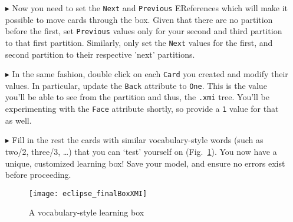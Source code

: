 \begin{itemize}
\item[$\blacktriangleright$] Now you need to set the \texttt{Next} and \texttt{Previous} EReferences which will make it possible to move cards through the
box. Given that there are no partition before the first, set \texttt{Previous} values only for your second and third partition to that first partition.
Similarly, only set the \texttt{Next} values for the first, and second partition to their respective 'next' partitions.

\item[$\blacktriangleright$] In the same fashion, double click on each \texttt{Card} you created and modify their values. In particular, update the
\texttt{Back} attribute to \texttt{One}. This is the value you'll be able to see from the partition and thus, the \texttt{.xmi} tree. You'll be experimenting
with the \texttt{Face} attribute shortly, so provide a \texttt{1} value for that as well.

\item[$\blacktriangleright$] Fill in the rest the cards with similar vocabulary-style words (such as two/2, three/3, \ldots) that you can `test' yourself on
(Fig.~\ref{eclipse:finalXMI}). You now have a unique, customized learning box! Save your model, and ensure no errors exist before proceeding.

\begin{figure}[htbp]
	\centering
  \texttt{[image: eclipse\_finalBoxXMI]}
	\caption{A vocabulary-style learning box}
	\label{eclipse:finalXMI}
\end{figure}

\end{itemize}
